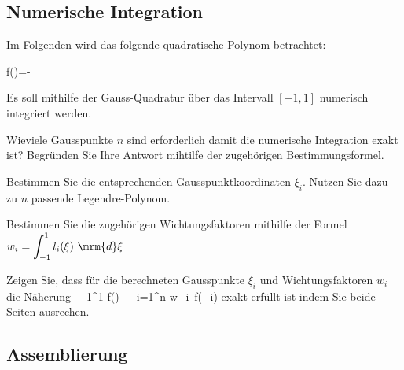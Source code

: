\clearpage

\subsection{Numerische Integration}


Im Folgenden wird das folgende quadratische Polynom betrachtet:

\eb
f(\xi)=-
\ee

Es soll mithilfe der Gauss-Quadratur über das Intervall $[-1,1]$ numerisch integriert werden.

\enab
\item Wieviele Gausspunkte $n$ sind erforderlich damit die numerische Integration exakt ist? 
 Begründen Sie Ihre Antwort mihtilfe der zugehörigen Bestimmungsformel.
\item Bestimmen Sie die entsprechenden Gausspunktkoordinaten $\xi_i$. Nutzen Sie dazu zu $n$ passende Legendre-Polynom.
\item Bestimmen Sie die zugehörigen Wichtungsfaktoren mithilfe der Formel 
$\displaystyle w_i=\int_{-1}^1 l_i(\xi)\ \mrm{d}\xi $
\item Zeigen Sie, dass für die berechneten Gausspunkte $\xi_i$ und Wichtungsfaktoren $w_i$ die Näherung
\ebn
\int_{-1}^1 f(\xi) \ \xi \approx \sum_{i=1}^n w_i\ f(\xi_i)
\een
     exakt erfüllt ist indem Sie beide Seiten ausrechen.
\enae




\clearpage
\subsection{Assemblierung}

{\center

 \label{fig:k1assem}
}


